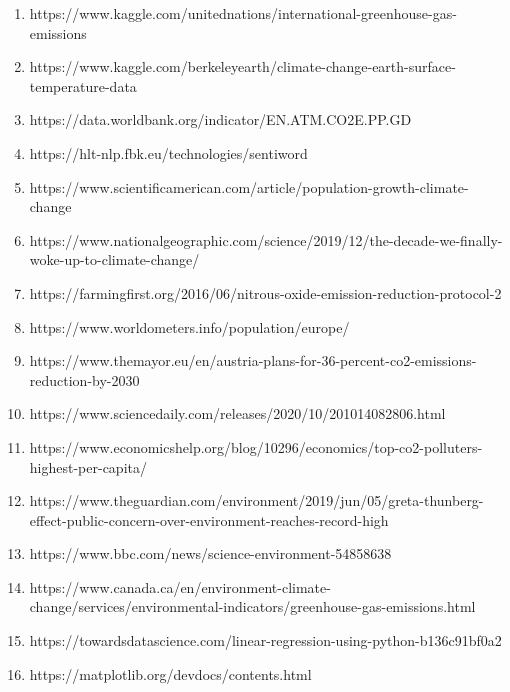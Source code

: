 \documentclass[a4paper, 11pt]{report}
\begin{document}
\begin{itemize}
\begin{enumerate}
    \item  https://www.kaggle.com/unitednations/international-greenhouse-gas-emissions

    \item  https://www.kaggle.com/berkeleyearth/climate-change-earth-surface-temperature-data

    \item  https://data.worldbank.org/indicator/EN.ATM.CO2E.PP.GD

    \item https://hlt-nlp.fbk.eu/technologies/sentiword

    \item https://www.scientificamerican.com/article/population-growth-climate-change

    \item https://www.nationalgeographic.com/science/2019/12/the-decade-we-finally-woke-up-to-climate-change/

    \item https://farmingfirst.org/2016/06/nitrous-oxide-emission-reduction-protocol-2

    \item https://www.worldometers.info/population/europe/

    \item https://www.themayor.eu/en/austria-plans-for-36-percent-co2-emissions-reduction-by-2030

    \item https://www.sciencedaily.com/releases/2020/10/201014082806.html

    \item https://www.economicshelp.org/blog/10296/economics/top-co2-polluters-highest-per-capita/

    \item https://www.theguardian.com/environment/2019/jun/05/greta-thunberg-effect-public-concern-over-environment-reaches-record-high

    \item https://www.bbc.com/news/science-environment-54858638

    \item https://www.canada.ca/en/environment-climate-change/services/environmental-indicators/greenhouse-gas-emissions.html

    \item https://towardsdatascience.com/linear-regression-using-python-b136c91bf0a2

    \item https://matplotlib.org/devdocs/contents.html


\end{enumerate}
\end{itemize}
\end{document}
